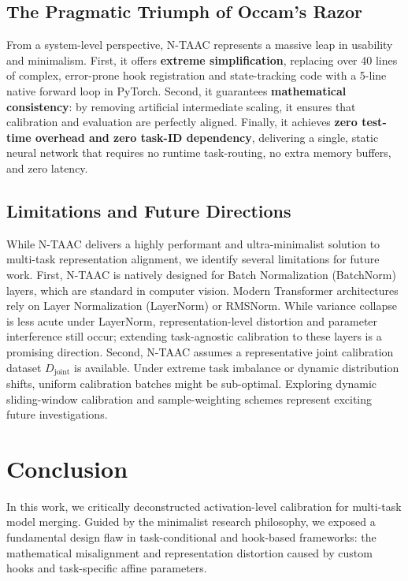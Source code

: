 \documentclass{article}
\theoremstyle{plain}
\theoremstyle{definition}
\theoremstyle{remark}
\begin{document}
\subsection{The Pragmatic Triumph of Occam's Razor}
From a system-level perspective, N-TAAC represents a massive leap in usability and minimalism. First, it offers \textbf{extreme simplification}, replacing over 40 lines of complex, error-prone hook registration and state-tracking code with a 5-line native forward loop in PyTorch. Second, it guarantees \textbf{mathematical consistency}: by removing artificial intermediate scaling, it ensures that calibration and evaluation are perfectly aligned. Finally, it achieves \textbf{zero test-time overhead and zero task-ID dependency}, delivering a single, static neural network that requires no runtime task-routing, no extra memory buffers, and zero latency.

\subsection{Limitations and Future Directions}
While N-TAAC delivers a highly performant and ultra-minimalist solution to multi-task representation alignment, we identify several limitations for future work. First, N-TAAC is natively designed for Batch Normalization (BatchNorm) layers, which are standard in computer vision. Modern Transformer architectures rely on Layer Normalization (LayerNorm) or RMSNorm. While variance collapse is less acute under LayerNorm, representation-level distortion and parameter interference still occur; extending task-agnostic calibration to these layers is a promising direction. Second, N-TAAC assumes a representative joint calibration dataset $D_{\text{joint}}$ is available. Under extreme task imbalance or dynamic distribution shifts, uniform calibration batches might be sub-optimal. Exploring dynamic sliding-window calibration and sample-weighting schemes represent exciting future investigations.

\section{Conclusion}
\label{submission-conclusion}
In this work, we critically deconstructed activation-level calibration for multi-task model merging. Guided by the minimalist research philosophy, we exposed a fundamental design flaw in task-conditional and hook-based frameworks: the mathematical misalignment and representation distortion caused by custom hooks and task-specific affine parameters.
\end{document}
